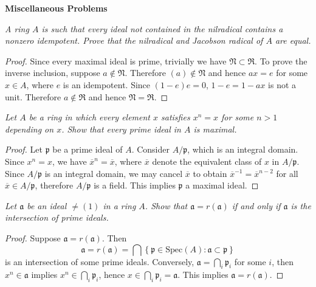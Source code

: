 \begin{center}
\begin{large}
    \textbf{Miscellaneous Problems}
\end{large}
\end{center}
\begin{problem}\em
A ring $A$ is such that every ideal not contained in the nilradical contains a nonzero idempotent. Prove that the nilradical and Jacobson radical of $A$ are equal.
\end{problem}
\begin{proof}
Since every maximal ideal is prime, trivially we have $\mathfrak{N}\subset\mathfrak{R}$. To prove the inverse inclusion, suppose $a\notin\mathfrak{N}$. Therefore $(a)\notin\mathfrak{N}$ and hence $ax=e$ for some $x\in A$, where $e$ is an idempotent. Since $(1-e)e=0$, $1-e=1-ax$ is not a unit. Therefore $a\notin\mathfrak{R}$ and hence $\mathfrak{N}=\mathfrak{R}$.
\end{proof}
\begin{problem}\em
Let $A$ be a ring in which every element $x$ satisfies $x^n=x$ for some $n>1$ depending on $x$. Show that every prime ideal in $A$ is maximal.
\end{problem}
\begin{proof}
Let $\mathfrak{p}$ be a prime ideal of $A$. Consider $A/\mathfrak{p}$, which is an integral domain. Since $x^n=x$, we have $\overline{x}^n=\overline{x}$, where $\overline{x}$ denote the equivalent class of $x$ in $A/\mathfrak{p}$. Since $A/\mathfrak{p}$ is an integral domain, we may cancel $\overline{x}$ to obtain $\overline{x}^{-1}=\overline{x}^{n-2}$ for all $\overline{x}\in A/\mathfrak{p}$, therefore $A/\mathfrak{p}$ is a field. This implies $\mathfrak{p}$ a maximal ideal.
\end{proof}
\begin{problem}\em
Let $\mathfrak{a}$ be an ideal $\ne (1)$ in a ring $A$. Show that $\mathfrak{a}=r(\mathfrak{a})$ if and only if $\mathfrak{a}$ is the intersection of prime ideals.
\end{problem}
\begin{proof}
Suppose $\mathfrak{a}=r(\mathfrak{a})$. Then 
$$
\mathfrak{a} =r\left( \mathfrak{a} \right) =\bigcap{\left\{ \mathfrak{p} \in \mathrm{Spec}\left( A \right) :\mathfrak{a} \subset \mathfrak{p} \right\}}
$$
is an intersection of some prime ideals. Conversely, $\mathfrak{a}=\bigcap_i\mathfrak{p}_i$ for some $i$, then $x^n\in\mathfrak{a}$ implies $x^n\in\bigcap_i\mathfrak{p}_i$, hence $x\in\bigcap_i\mathfrak{p}_i=\mathfrak{a}$. This implies $\mathfrak{a}=r(\mathfrak{a})$.
\end{proof}
